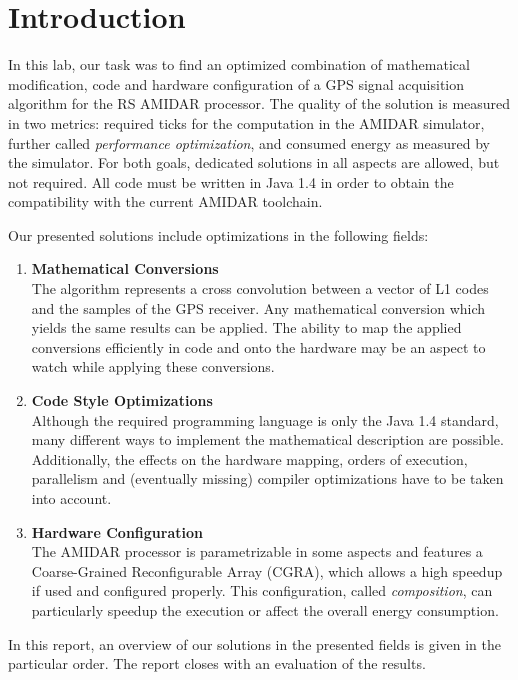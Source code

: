 \chapter{Introduction}
\label{cha:introduction}

In this lab, our task was to find an optimized combination of mathematical modification, code and hardware configuration
of a GPS signal acquisition algorithm for the RS AMIDAR processor. The quality of the solution is measured in two metrics:
required ticks for the computation in the AMIDAR simulator, further called \emph{performance optimization}, and consumed energy
as measured by the simulator. For both goals, dedicated solutions in all aspects are allowed, but not required. All code must be
written in Java 1.4 in order to obtain the compatibility with the current AMIDAR toolchain.

Our presented solutions include optimizations in the following fields:
\begin{enumerate}
    \item \textbf{Mathematical Conversions} \\ 
    The algorithm represents a cross convolution between a vector of L1 codes and the samples of the GPS receiver. Any mathematical 
    conversion which yields the same results can be applied. The ability to map the applied conversions efficiently in code and onto the hardware
    may be an aspect to watch while applying these conversions.\\
    \item \textbf{Code Style Optimizations}\\
    Although the required programming language is only the Java 1.4 standard, many different ways to implement the mathematical description
    are possible. Additionally, the effects on the hardware mapping, orders of execution, parallelism and (eventually missing) compiler optimizations
    have to be taken into account.\\
    \item \textbf{Hardware Configuration}\\
    The AMIDAR processor is parametrizable in some aspects and features a Coarse-Grained Reconfigurable Array (CGRA), which allows a high speedup if used and configured
    properly. This configuration, called \emph{composition}, can particularly speedup the execution or affect the overall energy consumption.
\end{enumerate}

In this report, an overview of our solutions in the presented fields is given in the particular order. The report closes with an evaluation of the results.